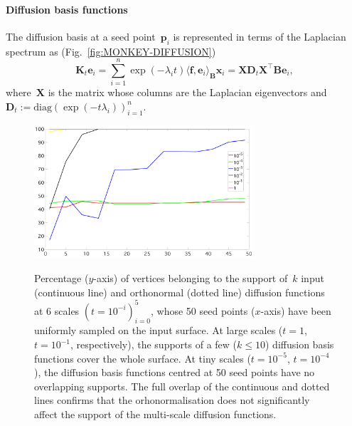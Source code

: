 \documentclass[acmtog,authorversion]{acmart}
\begin{document}
\paragraph{Diffusion basis functions}
The diffusion basis at a seed point~$\mathbf{p}_{i}$ is represented in terms of the Laplacian spectrum as (Fig.~\ref{fig:MONKEY-DIFFUSION})
%
\begin{equation}\label{eq:EIGS-SPECTRAL-OP}
\mathbf{K}_{t}\mathbf{e}_{i}
=\sum_{i=1}^{n}\exp(-\lambda_{i}t)\langle\mathbf{f},\mathbf{e}_{i}\rangle_{\mathbf{B}}\mathbf{x}_{i}
=\mathbf{X}\mathbf{D}_{t}\mathbf{X}^{\top}\mathbf{B}\mathbf{e}_{i},
\end{equation}
%
where~$\mathbf{X}$ is the matrix whose columns are the Laplacian eigenvectors and \mbox{$\mathbf{D}_{t}:=\textrm{diag}(\exp(-t\lambda_{i}))_{i=1}^{n}$}.
%
\begin{figure}[t]
\centering
\includegraphics[height=140pt]{FMAP-images/monkey-duffusion-support-14-UPDATED-1.jpg}\\
\caption{Percentage ($y$-axis) of vertices belonging to the support of~$k$ input (continuous line) and orthonormal (dotted line) diffusion functions at 6 scales \mbox{$(t=10^{-i})_{i=0}^{5}$}, whose 50 seed points ($x$-axis) have been uniformly sampled on the input surface. At large scales (\mbox{$t=1$}, \mbox{$t=10^{-1}$}, respectively), the supports of a few (\mbox{$k\leq10$}) diffusion basis functions cover the whole surface. At tiny scales (\mbox{$t=10^{-5}$}, \mbox{$t=10^{-4}$}), the diffusion basis functions centred at 50 seed points have no overlapping supports. The full overlap of the continuous and dotted lines confirms that the orhonormalisation does not significantly affect the support of the multi-scale diffusion functions.\label{fig:SEEDS}}
\end{figure}
\end{document}
